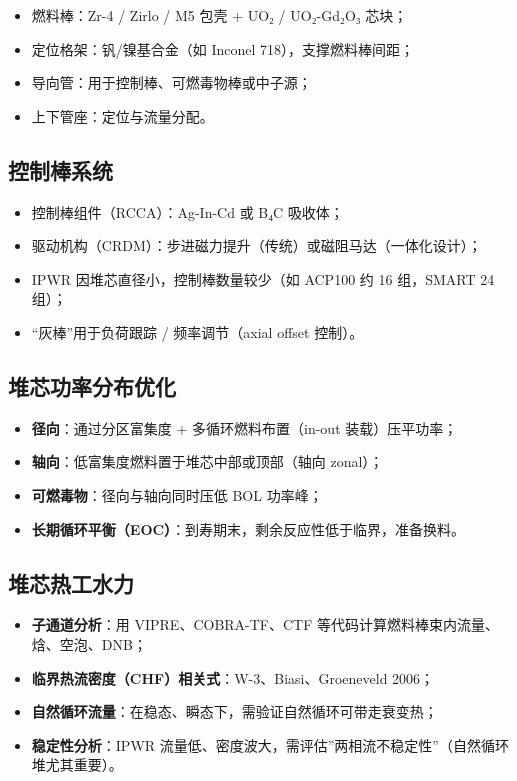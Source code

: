 \documentclass[
  UTF8,
  scheme=plain,
  fontsize=10pt,
  openany
]{ctexbook}
\begin{document}
\begin{itemize}
\tightlist
\item
  燃料棒：Zr-4 / Zirlo / M5 包壳 + UO₂ / UO₂-Gd₂O₃ 芯块；
\item
  定位格架：钒/镍基合金（如 Inconel 718），支撑燃料棒间距；
\item
  导向管：用于控制棒、可燃毒物棒或中子源；
\item
  上下管座：定位与流量分配。
\end{itemize}

\subsection{控制棒系统}\label{ux63a7ux5236ux68d2ux7cfbux7edf}

\begin{itemize}
\tightlist
\item
  控制棒组件（RCCA）：Ag-In-Cd 或 B₄C 吸收体；
\item
  驱动机构（CRDM）：步进磁力提升（传统）或磁阻马达（一体化设计）；
\item
  IPWR 因堆芯直径小，控制棒数量较少（如 ACP100 约 16 组，SMART 24 组）；
\item
  ``灰棒''用于负荷跟踪 / 频率调节（axial offset 控制）。
\end{itemize}

\subsection{堆芯功率分布优化}\label{ux5806ux82afux529fux7387ux5206ux5e03ux4f18ux5316}

\begin{itemize}
\tightlist
\item
  \textbf{径向}：通过分区富集度 + 多循环燃料布置（in-out
  装载）压平功率；
\item
  \textbf{轴向}：低富集度燃料置于堆芯中部或顶部（轴向 zonal）；
\item
  \textbf{可燃毒物}：径向与轴向同时压低 BOL 功率峰；
\item
  \textbf{长期循环平衡（EOC）}：到寿期末，剩余反应性低于临界，准备换料。
\end{itemize}

\subsection{堆芯热工水力}\label{ux5806ux82afux70edux5de5ux6c34ux529b}

\begin{itemize}
\tightlist
\item
  \textbf{子通道分析}：用 VIPRE、COBRA-TF、CTF
  等代码计算燃料棒束内流量、焓、空泡、DNB；
\item
  \textbf{临界热流密度（CHF）相关式}：W-3、Biasi、Groeneveld 2006；
\item
  \textbf{自然循环流量}：在稳态、瞬态下，需验证自然循环可带走衰变热；
\item
  \textbf{稳定性分析}：IPWR
  流量低、密度波大，需评估''两相流不稳定性''（自然循环堆尤其重要）。
\end{itemize}
\end{document}
